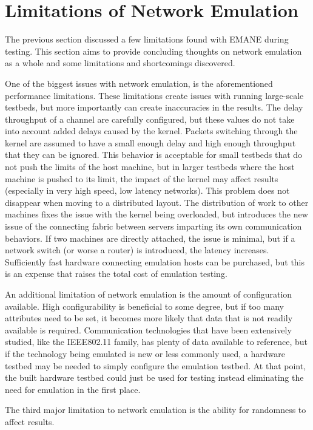\section{Limitations of Network Emulation}
The previous section discussed a few limitations found with EMANE during testing.
This section aims to provide concluding thoughts on network emulation as a whole and some limitations and shortcomings discovered.\par
One of the biggest issues with network emulation, is the aforementioned performance limitations.
These limitations create issues with running large-scale testbeds, but more importantly can create inaccuracies in the results.
The delay throughput of a channel are carefully configured, but these values do not take into account added delays caused by the kernel.
Packets switching through the kernel are assumed to have a small enough delay and high enough throughput that they can be ignored.
This behavior is acceptable for small testbeds that do not push the limits of the host machine, but in larger testbeds where the host machine is pushed to its limit, the impact of the kernel may affect results (especially in very high speed, low latency networks).
This problem does not disappear when moving to a distributed layout.
The distribution of work to other machines fixes the issue with the kernel being overloaded, but introduces the new issue of the connecting fabric between servers imparting its own communication behaviors.
If two machines are directly attached, the issue is minimal, but if a network switch (or worse a router) is introduced, the latency increases.
Sufficiently fast hardware connecting emulation hosts can be purchased, but this is an expense that raises the total cost of emulation testing. \par
An additional limitation of network emulation is the amount of configuration available.
High configurability is beneficial to some degree, but if too many attributes need to be set, it becomes more likely that data that is not readily available is required.
Communication technologies that have been extensively studied, like the IEEE802.11 family, has plenty of data available to reference, but if the technology being emulated is new or less commonly used, a hardware testbed may be needed to simply configure the emulation testbed.
At that point, the built hardware testbed could just be used for testing instead eliminating the need for emulation in the first place.\par
The third major limitation to network emulation is the ability for randomness to affect results. 
